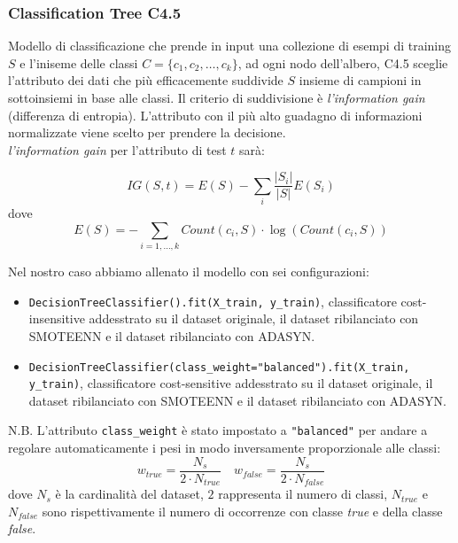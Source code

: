 \documentclass[italian,12pt,a4paper]{article}
\begin{document}
	\subsubsection{Classification Tree C4.5}
	Modello di classificazione che prende in input una collezione di esempi di training $S$ e l'iniseme delle classi $C = \{c_1, c_2, \dots, c_k\}$, ad ogni nodo dell'albero, C4.5 sceglie l'attributo dei dati che più efficacemente suddivide $S$ insieme di campioni in sottoinsiemi in base alle classi. Il criterio di suddivisione è \textit{l'information gain} (differenza di entropia). L'attributo con il più alto guadagno di informazioni normalizzate viene scelto per prendere la decisione. \\
	\textit{l'information gain} per l'attributo di test $t$ sarà:
	
	$$IG(S, t) = E(S) - \sum_i \frac{|S_i|}{|S|}E(S_i)$$ dove $$E(S) = -\sum_{i = 1, \dots, k} Count(c_i, S)\cdot\log(Count(c_i, S))$$
	
	Nel nostro caso abbiamo allenato il modello con sei configurazioni:
	
	\begin{itemize}
		\item \texttt{DecisionTreeClassifier().fit(X\_train, y\_train)}, classificatore cost-insensitive addesstrato su il dataset originale, il dataset ribilanciato con SMOTEENN e il dataset ribilanciato con ADASYN.
		\item \texttt{DecisionTreeClassifier(class\_weight="balanced").fit(X\_train, y\_train)}, classificatore cost-sensitive addesstrato su il dataset originale, il dataset ribilanciato con SMOTEENN e il dataset ribilanciato con ADASYN.
		
	\end{itemize}
	
	N.B. L'attributo \texttt{class\_weight} è stato impostato a \texttt{"balanced"} per andare a regolare automaticamente i pesi in modo inversamente proporzionale alle classi: $$w_{true} = \frac{N_s}{2\cdot N_{true}} \quad w_{false} = \frac{N_s}{2\cdot N_{false}} $$ dove $N_s$ è la cardinalità del dataset, $2$ rappresenta il numero di classi, $N_{true}$ e $N_{false}$ sono rispettivamente il numero di occorrenze con classe \textit{true} e della classe \textit{false}.
	
	
	
\end{document}

